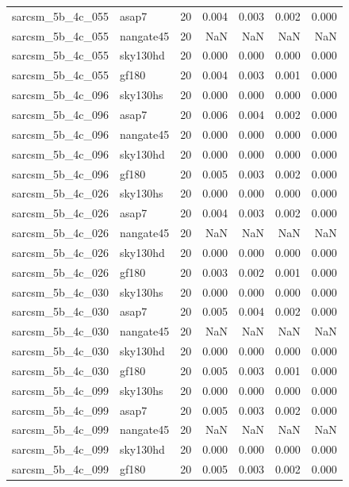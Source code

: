 \begin{tabular}{llrrrrr}
sarcsm\_5b\_4c\_055 & asap7 & 20 & 0.004 & 0.003 & 0.002 & 0.000 \\
sarcsm\_5b\_4c\_055 & nangate45 & 20 & NaN & NaN & NaN & NaN \\
sarcsm\_5b\_4c\_055 & sky130hd & 20 & 0.000 & 0.000 & 0.000 & 0.000 \\
sarcsm\_5b\_4c\_055 & gf180 & 20 & 0.004 & 0.003 & 0.001 & 0.000 \\
sarcsm\_5b\_4c\_096 & sky130hs & 20 & 0.000 & 0.000 & 0.000 & 0.000 \\
sarcsm\_5b\_4c\_096 & asap7 & 20 & 0.006 & 0.004 & 0.002 & 0.000 \\
sarcsm\_5b\_4c\_096 & nangate45 & 20 & 0.000 & 0.000 & 0.000 & 0.000 \\
sarcsm\_5b\_4c\_096 & sky130hd & 20 & 0.000 & 0.000 & 0.000 & 0.000 \\
sarcsm\_5b\_4c\_096 & gf180 & 20 & 0.005 & 0.003 & 0.002 & 0.000 \\
sarcsm\_5b\_4c\_026 & sky130hs & 20 & 0.000 & 0.000 & 0.000 & 0.000 \\
sarcsm\_5b\_4c\_026 & asap7 & 20 & 0.004 & 0.003 & 0.002 & 0.000 \\
sarcsm\_5b\_4c\_026 & nangate45 & 20 & NaN & NaN & NaN & NaN \\
sarcsm\_5b\_4c\_026 & sky130hd & 20 & 0.000 & 0.000 & 0.000 & 0.000 \\
sarcsm\_5b\_4c\_026 & gf180 & 20 & 0.003 & 0.002 & 0.001 & 0.000 \\
sarcsm\_5b\_4c\_030 & sky130hs & 20 & 0.000 & 0.000 & 0.000 & 0.000 \\
sarcsm\_5b\_4c\_030 & asap7 & 20 & 0.005 & 0.004 & 0.002 & 0.000 \\
sarcsm\_5b\_4c\_030 & nangate45 & 20 & NaN & NaN & NaN & NaN \\
sarcsm\_5b\_4c\_030 & sky130hd & 20 & 0.000 & 0.000 & 0.000 & 0.000 \\
sarcsm\_5b\_4c\_030 & gf180 & 20 & 0.005 & 0.003 & 0.001 & 0.000 \\
sarcsm\_5b\_4c\_099 & sky130hs & 20 & 0.000 & 0.000 & 0.000 & 0.000 \\
sarcsm\_5b\_4c\_099 & asap7 & 20 & 0.005 & 0.003 & 0.002 & 0.000 \\
sarcsm\_5b\_4c\_099 & nangate45 & 20 & NaN & NaN & NaN & NaN \\
sarcsm\_5b\_4c\_099 & sky130hd & 20 & 0.000 & 0.000 & 0.000 & 0.000 \\
sarcsm\_5b\_4c\_099 & gf180 & 20 & 0.005 & 0.003 & 0.002 & 0.000 \\

\end{tabular}
